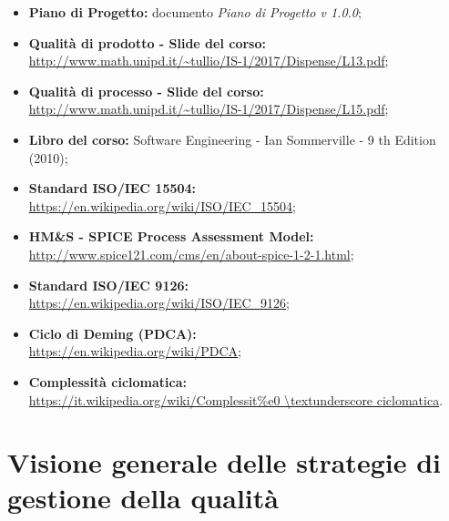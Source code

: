 \documentclass[openany,12pt,a4paper]{report}
\begin{document}
    \begin{itemize}
        \item \textbf{Piano di Progetto:} documento \textit{Piano di Progetto v 1.0.0};
        
        \item \textbf{Qualità di prodotto - Slide del corso:} 
        \\ \url{http://www.math.unipd.it/~tullio/IS-1/2017/Dispense/L13.pdf};
        
        \item \textbf{Qualità di processo - Slide del corso:} \\ \url{http://www.math.unipd.it/~tullio/IS-1/2017/Dispense/L15.pdf};
        
        \item \textbf{Libro del corso:} Software Engineering - Ian Sommerville - 9 th Edition (2010);
        
        \item \textbf{Standard ISO/IEC 15504:} 
        \\ \url{https://en.wikipedia.org/wiki/ISO/IEC_15504};
        
        \item \textbf{HM\&S - SPICE Process Assessment Model:} 
        \\ \url{http://www.spice121.com/cms/en/about-spice-1-2-1.html};
        
        \item \textbf{Standard ISO/IEC 9126:}
        \\ \url{https://en.wikipedia.org/wiki/ISO/IEC_9126};
        
        \item \textbf{Ciclo di Deming (PDCA):} 
        \\ \url{https://en.wikipedia.org/wiki/PDCA};
        
        \item \textbf{Complessità ciclomatica:} 
        \\ \url{https://it.wikipedia.org/wiki/Complessit\%e0 \textunderscore ciclomatica}.
    \end{itemize}


\chapter{Visione generale delle strategie di gestione della qualità}
    
\end{document}
